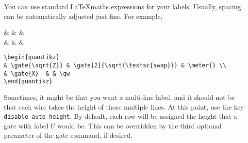 \documentclass[aps,pra,10pt,nofootinbib]{revtex4}
\begin{document}
You can use standard \LaTeX maths expressions for your labels. Usually, spacing can be automatically adjusted just fine. For example,

\begin{Code}
\begin{center}
\begin{quantikz}
&  &  & \meter{} \\
&   & & \qw
\end{quantikz}
\end{center}
\tcblower
\begin{lstlisting}
\begin{quantikz}
& \gate{\sqrt{Z}} & \gate[2]{\sqrt{\textsc{swap}}} & \meter{} \\
& \gate{X}  & & \qw
\end{quantikz}
\end{lstlisting}
\end{Code}

Sometimes, it might be that you want a multi-line label, and it should not be that each wire takes the height of those multiple lines. At this point, use the key \verb!disable auto height!. By default, each row will be assigned the height that a gate with label $U$ would be. This can be overridden by the third optional parameter of the gate command, if desired.
\end{document}
